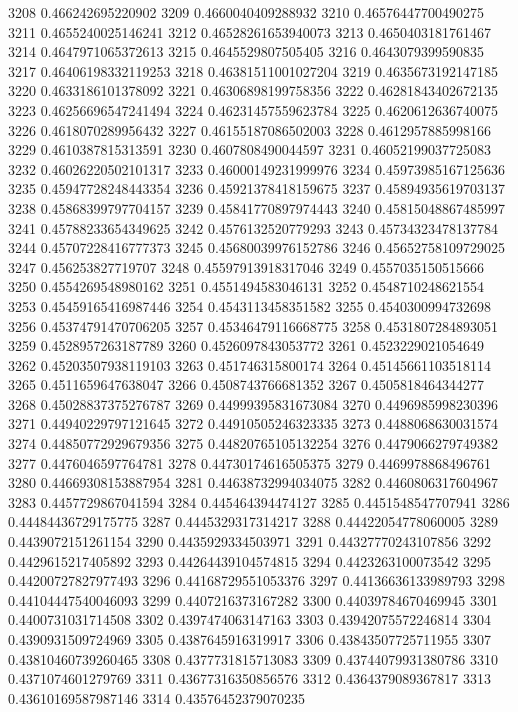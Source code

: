 3208 0.466242695220902
3209 0.4660040409288932
3210 0.46576447700490275
3211 0.4655240025146241
3212 0.46528261653940073
3213 0.4650403181761467
3214 0.4647971065372613
3215 0.4645529807505405
3216 0.4643079399590835
3217 0.46406198332119253
3218 0.46381511001027204
3219 0.4635673192147185
3220 0.4633186101378092
3221 0.46306898199758356
3222 0.46281843402672135
3223 0.46256696547241494
3224 0.46231457559623784
3225 0.4620612636740075
3226 0.4618070289956432
3227 0.46155187086502003
3228 0.4612957885998166
3229 0.4610387815313591
3230 0.4607808490044597
3231 0.46052199037725083
3232 0.46026220502101317
3233 0.46000149231999976
3234 0.45973985167125636
3235 0.45947728248443354
3236 0.45921378418159675
3237 0.45894935619703137
3238 0.45868399797704157
3239 0.45841770897974443
3240 0.45815048867485997
3241 0.45788233654349625
3242 0.4576132520779293
3243 0.45734323478137784
3244 0.45707228416777373
3245 0.45680039976152786
3246 0.45652758109729025
3247 0.456253827719707
3248 0.45597913918317046
3249 0.4557035150515666
3250 0.4554269548980162
3251 0.4551494583046131
3252 0.4548710248621554
3253 0.45459165416987446
3254 0.4543113458351582
3255 0.4540300994732698
3256 0.45374791470706205
3257 0.45346479116668775
3258 0.4531807284893051
3259 0.4528957263187789
3260 0.4526097843053772
3261 0.4523229021054649
3262 0.45203507938119103
3263 0.451746315800174
3264 0.45145661103518114
3265 0.4511659647638047
3266 0.4508743766681352
3267 0.4505818464344277
3268 0.45028837375276787
3269 0.44999395831673084
3270 0.4496985998230396
3271 0.44940229797121645
3272 0.44910505246323335
3273 0.4488068630031574
3274 0.44850772929679356
3275 0.44820765105132254
3276 0.4479066279749382
3277 0.4476046597764781
3278 0.44730174616505375
3279 0.4469978868496761
3280 0.44669308153887954
3281 0.44638732994034075
3282 0.4460806317604967
3283 0.4457729867041594
3284 0.445464394474127
3285 0.4451548547707941
3286 0.44484436729175775
3287 0.4445329317314217
3288 0.44422054778060005
3289 0.4439072151261154
3290 0.4435929334503971
3291 0.44327770243107856
3292 0.4429615217405892
3293 0.44264439104574815
3294 0.4423263100073542
3295 0.44200727827977493
3296 0.44168729551053376
3297 0.44136636133989793
3298 0.44104447540046093
3299 0.4407216373167282
3300 0.44039784670469945
3301 0.4400731031714508
3302 0.4397474063147163
3303 0.43942075572246814
3304 0.4390931509724969
3305 0.4387645916319917
3306 0.43843507725711955
3307 0.43810460739260465
3308 0.4377731815713083
3309 0.43744079931380786
3310 0.4371074601279769
3311 0.43677316350856576
3312 0.4364379089367817
3313 0.43610169587987146
3314 0.43576452379070235
